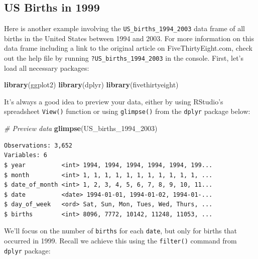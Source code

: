 \documentclass[12pt, krantz2,]{krantz}
\makeatletter
\newenvironment{Shaded}{\begin{snugshade}}{\end{snugshade}}
\newcommand{\CommentTok}[1]{\textcolor[rgb]{0.37,0.37,0.37}{\textit{#1}}}
\newcommand{\DecValTok}[1]{\textcolor[rgb]{0.06,0.06,0.06}{#1}}
\newcommand{\KeywordTok}[1]{\textcolor[rgb]{0.27,0.27,0.27}{\textbf{#1}}}
\newcommand{\NormalTok}[1]{#1}
\newcommand{\OperatorTok}[1]{\textcolor[rgb]{0.43,0.43,0.43}{\textbf{#1}}}
\newcommand{\StringTok}[1]{\textcolor[rgb]{0.5,0.5,0.5}{#1}}
\newenvironment{kframe}{%
\medskip{}
\setlength{\fboxsep}{.8em}
 \def\at@end@of@kframe{}%
 \ifinner\ifhmode%
  \def\at@end@of@kframe{\end{minipage}}%
  \begin{minipage}{\columnwidth}%
 \fi\fi%
 \def\FrameCommand##1{\hskip\@totalleftmargin \hskip-\fboxsep
 \colorbox{shadecolor}{##1}\hskip-\fboxsep
     \hskip-\linewidth \hskip-\@totalleftmargin \hskip\columnwidth}%
 \MakeFramed {\advance\hsize-\width
   \@totalleftmargin\z@ \linewidth\hsize
   \@setminipage}}%
 {\par\unskip\endMakeFramed%
 \at@end@of@kframe}
\renewenvironment{Shaded}{\begin{kframe}}{\end{kframe}}
\makeatother
\begin{document}
\hypertarget{us-births-in-1999}{%
\subsection{US Births in 1999}\label{us-births-in-1999}}

Here is another example involving the \texttt{US\_births\_1994\_2003} data frame of all births in the United States between 1994 and 2003. For more information on this data frame including a link to the original article on FiveThirtyEight.com, check out the help file by running \texttt{?US\_births\_1994\_2003} in the console. First, let's load all necessary packages:

\begin{Shaded}
\begin{Highlighting}[]
\KeywordTok{library}\NormalTok{(ggplot2)}
\KeywordTok{library}\NormalTok{(dplyr)}
\KeywordTok{library}\NormalTok{(fivethirtyeight)}
\end{Highlighting}
\end{Shaded}

It's always a good idea to preview your data, either by using RStudio's spreadsheet \texttt{View()} function or using \texttt{glimpse()} from the \texttt{dplyr} package below:

\begin{Shaded}
\begin{Highlighting}[]
\CommentTok{# Preview data}
\KeywordTok{glimpse}\NormalTok{(US_births_}\DecValTok{1994}\NormalTok{_}\DecValTok{2003}\NormalTok{)}
\end{Highlighting}
\end{Shaded}

\begin{verbatim}
Observations: 3,652
Variables: 6
$ year          <int> 1994, 1994, 1994, 1994, 1994, 199...
$ month         <int> 1, 1, 1, 1, 1, 1, 1, 1, 1, 1, 1, ...
$ date_of_month <int> 1, 2, 3, 4, 5, 6, 7, 8, 9, 10, 11...
$ date          <date> 1994-01-01, 1994-01-02, 1994-01-...
$ day_of_week   <ord> Sat, Sun, Mon, Tues, Wed, Thurs, ...
$ births        <int> 8096, 7772, 10142, 11248, 11053, ...
\end{verbatim}

We'll focus on the number of \texttt{births} for each \texttt{date}, but only for births that occurred in 1999. Recall we achieve this using the \texttt{filter()} command from \texttt{dplyr} package:

\begin{Shaded}
\end{Shaded}
\end{document}
